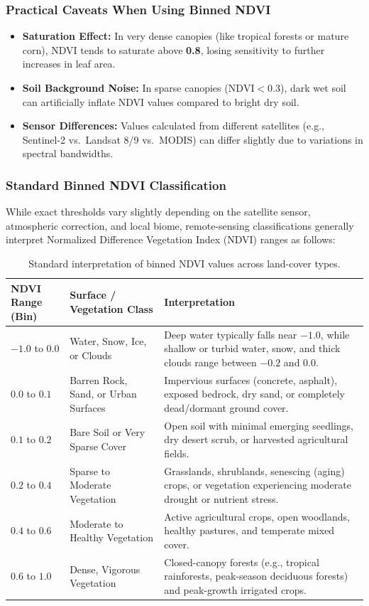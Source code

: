 \documentclass[12pt, letterpaper]{article}
\begin{document}
\subsubsection*{Practical Caveats When Using Binned NDVI}
\begin{itemize}
    \item \textbf{Saturation Effect:} In very dense canopies (like tropical forests or mature corn), NDVI tends to saturate above \textbf{0.8}, losing sensitivity to further increases in leaf area.
    \item \textbf{Soil Background Noise:} In sparse canopies ($\text{NDVI} < 0.3$), dark wet soil can artificially inflate NDVI values compared to bright dry soil.
    \item \textbf{Sensor Differences:} Values calculated from different satellites (e.g., Sentinel-2 vs.\ Landsat 8/9 vs.\ MODIS) can differ slightly due to variations in spectral bandwidths.
\end{itemize}

\subsubsection*{Standard Binned NDVI Classification}

While exact thresholds vary slightly depending on the satellite sensor, atmospheric correction, and local biome, remote-sensing classifications generally interpret Normalized Difference Vegetation Index (NDVI) ranges as follows:

\begin{table}[h!]
\centering
\renewcommand{\arraystretch}{1.35}
\begin{tabularx}{\textwidth}{p{2.4cm} p{4.2cm} X}
\toprule
\textbf{NDVI Range (Bin)} & \textbf{Surface / Vegetation Class} & \textbf{Interpretation} \\
\midrule
$-1.0$ to $0.0$ & Water, Snow, Ice, or Clouds & Deep water typically falls near $-1.0$, while shallow or turbid water, snow, and thick clouds range between $-0.2$ and $0.0$. \\
$0.0$ to $0.1$ & Barren Rock, Sand, or Urban Surfaces & Impervious surfaces (concrete, asphalt), exposed bedrock, dry sand, or completely dead/dormant ground cover. \\
$0.1$ to $0.2$ & Bare Soil or Very Sparse Cover & Open soil with minimal emerging seedlings, dry desert scrub, or harvested agricultural fields. \\
$0.2$ to $0.4$ & Sparse to Moderate Vegetation & Grasslands, shrublands, senescing (aging) crops, or vegetation experiencing moderate drought or nutrient stress. \\
$0.4$ to $0.6$ & Moderate to Healthy Vegetation & Active agricultural crops, open woodlands, healthy pastures, and temperate mixed cover. \\
$0.6$ to $1.0$ & Dense, Vigorous Vegetation & Closed-canopy forests (e.g., tropical rainforests, peak-season deciduous forests) and peak-growth irrigated crops. \\
\bottomrule
\end{tabularx}
\caption{Standard interpretation of binned NDVI values across land-cover types.}
\end{table}
\end{document}
